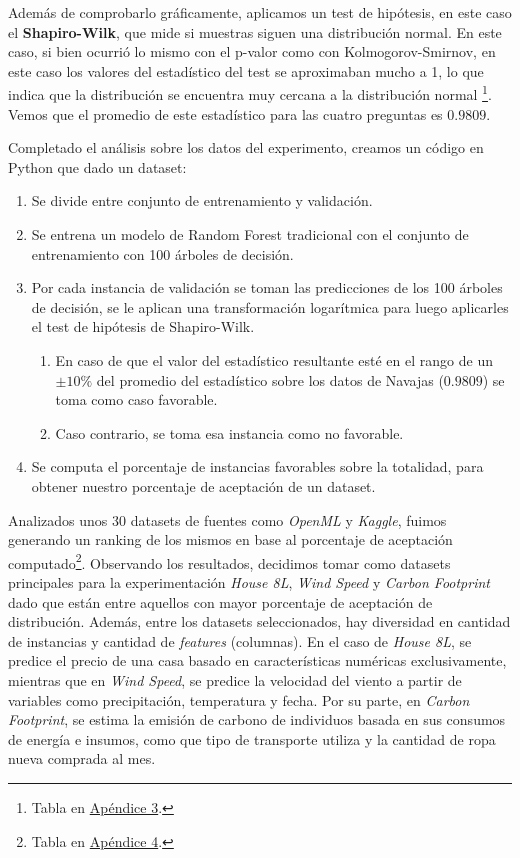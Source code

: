 Además de comprobarlo gráficamente, aplicamos un test de hipótesis, en este caso el \textbf{Shapiro-Wilk}, que mide si muestras siguen una distribución normal. En este caso, si bien ocurrió lo mismo con el p-valor como con Kolmogorov-Smirnov, en este caso los valores del estadístico del test se aproximaban mucho a 1, lo que indica que la distribución se encuentra muy cercana a la distribución normal \footnote{Tabla en \hyperref[appendix3]{Apéndice 3}.}. Vemos que el promedio de este estadístico para las cuatro preguntas es $0.9809$.

Completado el análisis sobre los datos del experimento, creamos un código en Python que dado un dataset:

\begin{enumerate}
    \item Se divide entre conjunto de entrenamiento y validación.
    \item Se entrena un modelo de Random Forest tradicional con el conjunto de entrenamiento con 100 árboles de decisión.
    \item Por cada instancia de validación se toman las predicciones de los 100 árboles de decisión, se le aplican una transformación logarítmica para luego aplicarles el test de hipótesis de Shapiro-Wilk.
    \begin{enumerate}
        \item En caso de que el valor del estadístico resultante esté en el rango de un $\pm 10\%$ del promedio del estadístico sobre los datos de Navajas ($0.9809$) se toma como caso favorable.
        \item Caso contrario, se toma esa instancia como no favorable.
    \end{enumerate}
    \item Se computa el porcentaje de instancias favorables sobre la totalidad, para obtener nuestro porcentaje de aceptación de un dataset.
\end{enumerate}

Analizados unos 30 datasets de fuentes como \textit{OpenML} y \textit{Kaggle}, fuimos generando un ranking de los mismos en base al porcentaje de aceptación computado\footnote{Tabla en \hyperref[appendix4]{Apéndice 4}.}. Observando los resultados, decidimos tomar como datasets principales para la experimentación \textit{House 8L}, \textit{Wind Speed} y \textit{Carbon Footprint} dado que están entre aquellos con mayor porcentaje de aceptación de distribución. Además, entre los datasets seleccionados, hay diversidad en cantidad de instancias y cantidad de \textit{features} (columnas). En el caso de \textit{House 8L}, se predice el precio de una casa basado en características numéricas exclusivamente, mientras que en \textit{Wind Speed}, se predice la velocidad del viento a partir de variables como precipitación, temperatura y fecha. Por su parte, en \textit{Carbon Footprint}, se estima la emisión de carbono de individuos basada en sus consumos de energía e insumos, como que tipo de transporte utiliza y la cantidad de ropa nueva comprada al mes.

